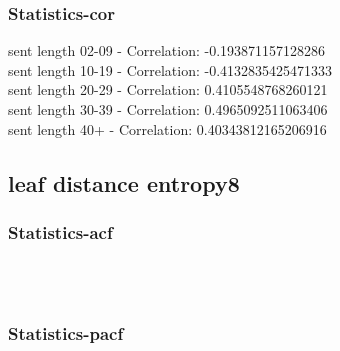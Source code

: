 \documentclass{article}%
\begin{document}
%
\newpage%
\subsubsection{Statistics{-}cor}%
\label{ssubsec:Statistics{-}cor}%
\noindent%
sent length 02-09 - Correlation: -0.193871157128286\\%
sent length 10-19 - Correlation: -0.4132835425471333\\%
sent length 20-29 - Correlation: 0.4105548768260121\\%
sent length 30-39 - Correlation: 0.4965092511063406\\%
sent length 40+ - Correlation: 0.40343812165206916\\

%
\newpage

%
\subsection{leaf distance entropy8}%
\label{subsec:leafdistanceentropy8}%
\subsubsection{Statistics{-}acf}%
\label{ssubsec:Statistics{-}acf}%


\begin{figure}[ht]%
\centering%
\setlength{\abovecaptionskip}{-35pt}%
%
%
\\%
%
%
\\%
%
\end{figure}

%
\newpage%
\subsubsection{Statistics{-}pacf}%
\label{ssubsec:Statistics{-}pacf}%
\end{document}

